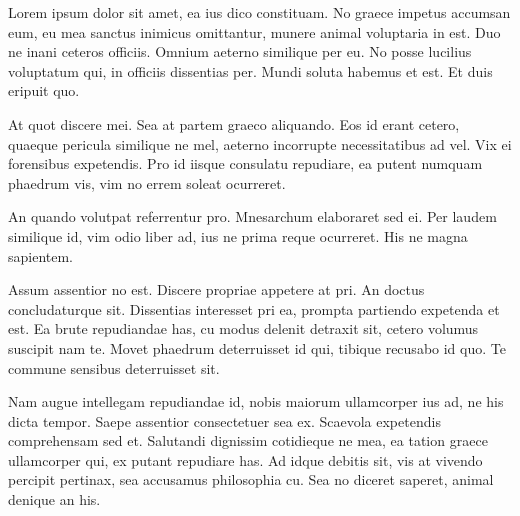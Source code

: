 Lorem ipsum dolor sit amet, ea ius dico constituam. No graece impetus accumsan eum, eu mea sanctus inimicus omittantur, munere animal voluptaria in est. Duo ne inani ceteros officiis. Omnium aeterno similique per eu. No posse lucilius voluptatum qui, in officiis dissentias per. Mundi soluta habemus et est. Et duis eripuit quo.

At quot discere mei. Sea at partem graeco aliquando. Eos id erant cetero, quaeque pericula similique ne mel, aeterno incorrupte necessitatibus ad vel. Vix ei forensibus expetendis. Pro id iisque consulatu repudiare, ea putent numquam phaedrum vis, vim no errem soleat ocurreret.

An quando volutpat referrentur pro. Mnesarchum elaboraret sed ei. Per laudem similique id, vim odio liber ad, ius ne prima reque ocurreret. His ne magna sapientem.

Assum assentior no est. Discere propriae appetere at pri. An doctus concludaturque sit. Dissentias interesset pri ea, prompta partiendo expetenda et est. Ea brute repudiandae has, cu modus delenit detraxit sit, cetero volumus suscipit nam te. Movet phaedrum deterruisset id qui, tibique recusabo id quo. Te commune sensibus deterruisset sit.

Nam augue intellegam repudiandae id, nobis maiorum ullamcorper ius ad, ne his dicta tempor. Saepe assentior consectetuer sea ex. Scaevola expetendis comprehensam sed et. Salutandi dignissim cotidieque ne mea, ea tation graece ullamcorper qui, ex putant repudiare has. Ad idque debitis sit, vis at vivendo percipit pertinax, sea accusamus philosophia cu. Sea no diceret saperet, animal denique an his.